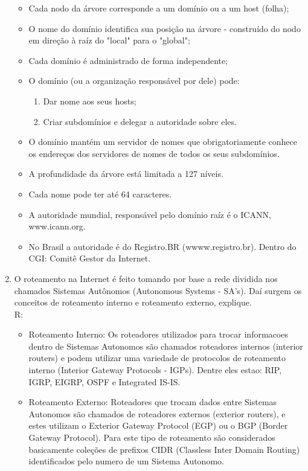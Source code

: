 \documentclass{article}
\begin{document}
\begin{enumerate}
\begin{itemize}
   \item Cada nodo da árvore corresponde a um domínio ou a um host (folha);
   \item O nome do domínio identifica sua posição na árvore - construído do nodo em
direção à raíz do "local" para o "global";
   \item Cada domínio é administrado de forma independente;
   \item O domínio (ou a organização responsável por dele) pode:
      \begin{enumerate}
         \item Dar nome aos seus hosts;
         \item Criar subdomínios e delegar a autoridade sobre eles.
      \end{enumerate}
   \item O domínio mantém um servidor de nomes que obrigatoriamente conhece os endereços
dos servidores de nomes de todos os seus subdomínios.
   \item A profundidade da árvore está limitada a 127 níveis.
   \item Cada nome pode ter até 64 caracteres.
   \item A autoridade mundial, responsável pelo domínio raíz é o ICANN, www.icann.org.
   \item No Brasil a autoridade é do Registro.BR (wwww.registro.br). Dentro do CGI: Comitê
Gestor da Internet.
\end{itemize}

	

	
	\item O roteamento na Internet é feito tomando por base a rede dividida nos chamados Sistemas Autônomos (Autonomous Systems - SA's). Daí surgem os conceitos de roteamento interno e roteamento externo, explique.
	\\
	R:
	\begin{itemize}
		\item Roteamento Interno:
		Os roteadores utilizados para trocar informacoes dentro de Sistemas
		Autonomos são chamados roteadores internos (interior routers) e podem
		utilizar uma variedade de protocolos de roteamento interno (Interior
		Gateway Protocols - IGPs). Dentre eles estao: RIP, IGRP, EIGRP, OSPF e
		Integrated IS-IS.
		\item Roteamento Externo:
		Roteadores que trocam dados entre Sistemas Autonomos são chamados de
		roteadores externos (exterior routers), e estes utilizam o Exterior
		Gateway Protocol (EGP) ou o BGP (Border Gateway Protocol). Para este
		tipo de roteamento são considerados basicamente coleções de prefixos
		CIDR (Classless Inter Domain Routing) identificados pelo numero de um
		Sistema Autonomo.
	\end{itemize}
	

\end{enumerate}
\end{document}
